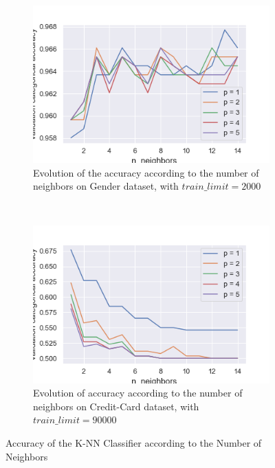 \documentclass[10pt]{article}
\begin{document}
		\paragraph*{}
			\begin{figure}[h]
				\centering
				\begin{subfigure}[]{0.45\columnwidth}
					\centering
					\includegraphics[width=\linewidth]{../graphics/knn_gender_neighbors.png}
					\caption{Evolution of the accuracy according to the number of neighbors on Gender dataset, with $train\_limit = 2000$}
					\label{knn:g_neighbors}
				\end{subfigure}
				~
				\begin{subfigure}[]{0.45\columnwidth}
					\centering
					\includegraphics[width=\linewidth]{../graphics/knn_creditcard_neighbors.png}
					\caption{Evolution of accuracy according to the number of neighbors on Credit-Card dataset, with $train\_limit = 90000$}
					\label{knn:cc_neighbors}
				\end{subfigure}
				\caption{Accuracy of the K-NN Classifier according to the Number of Neighbors}
				\label{knn:neighbors}
			\end{figure}
\end{document}
